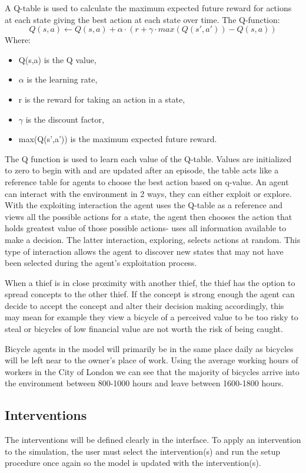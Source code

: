 \documentclass[11pt]{informatics-report}
\begin{document}
A Q-table is used to calculate the maximum expected future reward for actions at each state giving the best action at each state over time. The Q-function: \[Q(s,a) \leftarrow Q(s,a) + \alpha \cdot (r + \gamma \cdot max(Q(s',a')) - Q(s,a)) \]
\parindent \parindent Where:
\begin{itemize}
\item Q(s,a) is the Q value,
\item $\alpha$ is the learning rate,
\item r is the reward for taking an action in a state,
\item $\gamma$ is the discount factor,
\item max(Q(s',a')) is the maximum expected future reward.
\end{itemize}
The Q function is used to learn each value of the Q-table. Values are initialized to zero to begin with and are updated after an episode, the table acts like a reference table for agents to choose the best action based on q-value. An agent can interact with the environment in 2 ways, they can either exploit or explore. With the exploiting interaction the agent uses the Q-table as a reference and views all the possible actions for a state, the agent then chooses the action that holds greatest value of those possible actions- uses all information available to make a decision. The latter interaction, exploring, selects actions at random. This type of interaction allows the agent to discover new states that may not have been selected during the agent's exploitation process. \par

When a thief is in close proximity with another thief, the thief has the option to spread concepts to the other thief. If the concept is strong enough the agent can decide to accept the concept and alter their decision making accordingly, this may mean for example they view a bicycle of a perceived value to be too risky to steal or bicycles of low financial value are not worth the risk of being caught. \par

Bicycle agents in the model will primarily be in the same place daily as bicycles will be left near to the owner's place of work. Using the average working hours of workers in the City of London we can see that the majority of bicycles arrive into the environment between 800-1000 hours and leave between 1600-1800 hours.

\subsection{Interventions}
The interventions will be defined clearly in the interface. To apply an intervention to the simulation, the user must select the intervention(s) and run the setup procedure once again so the model is updated with the intervention(s).
\end{document}
